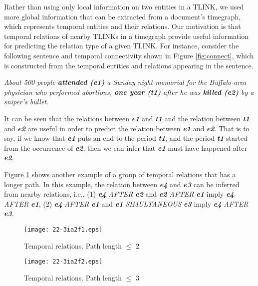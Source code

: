 \documentclass[english]{jnlp_1.4}
\begin{document}
Rather than using only local information on two entities in a TLINK, we used more global information that can be extracted from a document's timegraph, which represents temporal entities and their relations.
Our motivation is that temporal relations of nearby TLINKs in a timegraph provide useful information for predicting the relation type of a given TLINK. 
For instance, consider the following sentence and temporal connectivity shown in Figure \ref{fig:connect}, which is constructed from the temporal entities and relations appearing in the sentence.

\begin{framed}
\textit{About 500 people \textbf{attended (e1)} a Sunday night memorial for the Buffalo-area physician who performed abortions, \textbf{one year (t1)} after he was \textbf{killed (e2)} by a sniper's bullet.
}
\end{framed}

It can be seen that the relations between {\itshape\textbf{e1}} and \emph{\textbf{t1}} and the relation between \emph{\textbf{t1}} and \emph{\textbf{e2}} are useful in order to predict the relation between \emph{\textbf{e1}} and \emph{\textbf{e2}}.
That is to say, if we know that \emph{\textbf{e1}} puts an end to the period \emph{\textbf{t1}}, and the period \emph{\textbf{t1}} started from the occurrence of \emph{\textbf{e2}}, then we can infer that \emph{\textbf{e1}} must have happened after \emph{\textbf{e2}}.

Figure \ref{fig:connect2} shows another example of a group of temporal relations that has a longer path. 
In this example, the relation between \emph{\textbf{e4}} and \emph{\textbf{e3}} can be inferred from nearby relations, i.e., (1) \emph{\textbf{e4}} {\em AFTER} \emph{\textbf{e2}} and \emph{\textbf{e2}} {\em AFTER} \emph{\textbf{e1}} imply  \emph{\textbf{e4}} {\em AFTER} \emph{\textbf{e1}}, (2) \emph{\textbf{e4}} {\em AFTER} \emph{\textbf{e1}} and \emph{\textbf{e1}} {\em SIMULTANEOUS} \emph{\textbf{e3}} imply \emph{\textbf{e4}} {\em AFTER} \emph{\textbf{e3}}.

\begin{figure}[b]
\begin{minipage}[b]{.45\textwidth}
\begin{center}
\texttt{[image: 22-3ia2f1.eps]}
\end{center}
\caption{Temporal relations. Path length $\leq$ 2}
\label{fig:connect}
\end{minipage}
\hfill
\begin{minipage}[b]{.45\textwidth}
\begin{center}
\texttt{[image: 22-3ia2f2.eps]}
\end{center}
\caption{Temporal relations. Path length $\leq$ 3}
\label{fig:connect2}
\end{minipage}
\end{figure}
\end{document}
